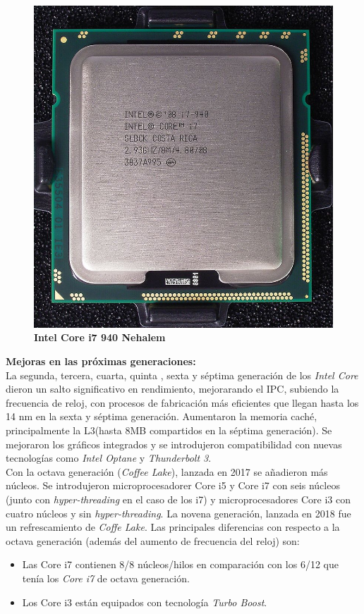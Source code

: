 \begin{figure}[htb]
	\centering
	\includegraphics[scale = 0.2]{Graphics/Intel_core_i7_940_top_R7309478_wp.jpg}
	\caption{\textbf{Intel Core i7 940 Nehalem}}
	\label{fig:25}
\end{figure}



\textbf{Mejoras en las próximas generaciones:}\\
La segunda, tercera, cuarta, quinta , sexta y séptima generación de los \emph{Intel Core} dieron un salto significativo en rendimiento, mejorarando
el IPC, subiendo la frecuencia de reloj,  con   procesos de fabricación  más eficientes que llegan hasta los 14 nm en la sexta y séptima generación.
Aumentaron la memoria caché, principalmente la L3(hasta 8MB compartidos en la séptima generación). Se mejoraron los gráficos integrados y se introdujeron 
compatibilidad con nuevas tecnologías como \emph{Intel Optane} y \emph{Thunderbolt 3}.\\
Con la octava generación (\emph{Coffee Lake}), lanzada en 2017 se añadieron más núcleos. Se introdujeron microprocesadorer Core i5 y Core i7 con seis núcleos 
(junto con \emph{hyper-threading} en el caso de los i7) y microprocesadores Core i3 con cuatro núcleos y sin \emph{hyper-threading}.
La novena generación, lanzada en 2018 fue un refrescamiento de \emph{Coffe Lake}. Las principales diferencias con respecto a la 
octava generación (además del aumento de frecuencia del reloj) son:
\begin{itemize}
	\item Las Core i7 contienen 8/8 núcleos/hilos en comparación con los 6/12 que tenía los \emph{Core i7} de octava generación.
	\item Los Core i3 están equipados con tecnología \emph{Turbo Boost}. 	
\end{itemize}


